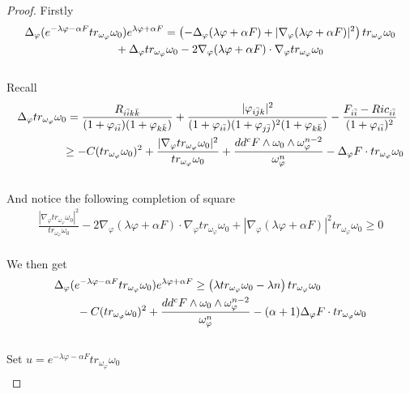 \documentclass[11pt]{amsart}
\numberwithin{equation}{section}
\begin{document}
\begin{proof}

Firstly
\begin{align}
	& \Delta_\varphi (e^{-\lambda\varphi-\alpha F}tr_{\omega_{\varphi}}\omega_0)e^{\lambda\varphi+\alpha F} = \left(-\Delta_\varphi (\lambda\varphi+\alpha F)+|\nabla_\varphi (\lambda\varphi+\alpha F)|^2\right)tr_{\omega_{\varphi}}\omega_0  \notag\\
	&\qquad\qquad\qquad\qquad +\Delta_\varphi tr_{\omega_{\varphi}}\omega_0 - 2\nabla_\varphi(\lambda\varphi+\alpha F)\cdot\nabla_\varphi tr_{\omega_{\varphi}}\omega_0
\end{align}\\
Recall 
\begin{align}
	& \Delta_\varphi tr_{\omega_{\varphi}}\omega_0 = \frac{R_{i\bar ik\bar k}}{(1+\varphi_{i\bar i})(1+\varphi_{k\bar k})} + \frac{|\varphi_{i\bar jk}|^2}{(1+\varphi_{i\bar i})(1+\varphi_{j\bar j})^2(1+\varphi_{k\bar k})} -\frac{F_{i\bar i}-Ric_{i\bar i}}{(1+\varphi_{i\bar i})^2} \notag\\
	&\qquad\qquad \ge  -C (tr_{\omega_{\varphi}}\omega_0)^2 + \frac{|\nabla_\varphi tr_{\omega_{\varphi}}\omega_0|^2}{tr_{\omega_{\varphi}}\omega_0}+ \frac{dd^c F\wedge \omega_0\wedge\omega_\varphi^{n-2}}{\omega_\varphi^n}  - \Delta_\varphi F\cdot tr_{\omega_{\varphi}}\omega_0 
\end{align}\\
And notice the following completion of square 
\begin{align}
	\frac{|\nabla_\varphi tr_{\omega_{\varphi}}\omega_0|^2}{tr_{\omega_{\varphi}}\omega_0} - 2\nabla_\varphi(\lambda\varphi+\alpha F)\cdot\nabla_\varphi tr_{\omega_{\varphi}}\omega_0 + |\nabla_\varphi (\lambda\varphi+\alpha F)|^2 tr_{\omega_{\varphi}}\omega_0  \ge  0
\end{align}\\
We then get 
\begin{align}
	& \Delta_\varphi (e^{-\lambda\varphi-\alpha F}tr_{\omega_{\varphi}}\omega_0)e^{\lambda\varphi+\alpha F} \ge  \left(\lambda tr_{\omega_{\varphi}}\omega_0 -\lambda n  \right)tr_{\omega_{\varphi}}\omega_0 \notag\\
	&\qquad -C (tr_{\omega_{\varphi}}\omega_0)^2 + \frac{dd^c F\wedge \omega_0\wedge\omega_\varphi^{n-2}}{\omega_\varphi^n}  - (\alpha+1) \Delta_\varphi F\cdot tr_{\omega_{\varphi}}\omega_0
\end{align}\\
Set $u=e^{-\lambda\varphi-\alpha F}tr_{\omega_{\varphi}}\omega_0$ 
\begin{align}

\end{align}
\end{proof}
\end{document}
